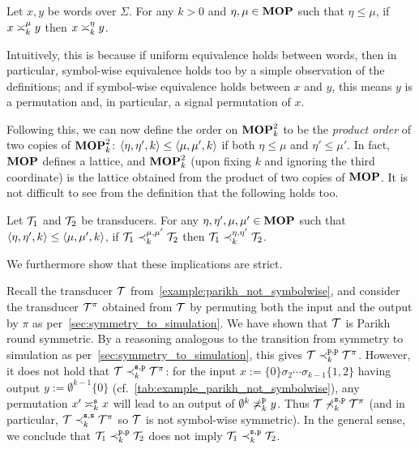 \begin{lemma}
\label{lemma:partial_order_rstypes}
    Let $x,y$ be words over $\Sigma$. For any $k>0$ and $\eta,\mu\in\RSTYPES$ such that $\eta\leq \mu$, if $x\req[k]^\mu y$ then $x\req[k]^\eta y$.
\end{lemma}

Intuitively, this is because if uniform equivalence holds between words, then in particular, symbol-wise equivalence holds too by a simple observation of the definitions; and if symbol-wise equivalence holds between $x$ and $y$, this means $y$ is a permutation and, in particular, a signal permutation of $x$.

Following this, we can now define the order on $\RSTUPS$ to be the \emph{product order} of two copies of $\RSTUPS$: $\tup{\eta, \eta', k}\leq \tup{\mu, \mu', k}$ if both $\eta\leq \mu$ and $\eta'\leq \mu'$. In fact, $\RSTYPES$ defines a lattice, and $\RSTUPS$ (upon fixing $k$ and ignoring the third coordinate) is the lattice obtained from the product of two copies of $\RSTYPES$. It is not difficult to see from the definition that the following holds too.

\begin{lemma}
\label{lemma:partial_order_tups}
        Let $\cT_1$ and $\cT_2$ be transducers. For any $\eta,\eta',\mu,\mu'\in\RSTYPES$ such that $\tup{\eta,\eta',k}\leq \tup{\mu,\mu',k}$, if $\cT_1 \prec_{k}^{\mu,\mu'} \cT_2$ then $\cT_1 \prec_{k}^{\eta,\eta'} \cT_2$.
\end{lemma}
We furthermore show that these implications are strict.

\begin{example}
\label{example:gap1}
Recall the transducer $\cT$ from~\cref{example:parikh_not_symbolwise}, and consider the transducer $\cT^\pi$ obtained from $\cT$ by permuting both the input and the output by $\pi$ as per~\cref{sec:symmetry_to_simulation}. We have shown that $\cT$ is Parikh round symmetric. By a reasoning analogous to the transition from symmetry to simulation as per~\cref{sec:symmetry_to_simulation}, this gives $\cT\prectype{p}{p}_k \cT^\pi$. However, it does not hold that $\cT\prectype{s}{p}_k \cT^\pi$: for the input $x:=\{0\}\sigma_2\cdots \sigma_{k-1}\{1,2\}$ having output $y:=\emptyset^{k-1}\{0\}$ (cf.~\cref{tab:example_parikh_not_symbolwise}), any permutation $x'\reqtype[k]{s} x$ will lead to an output of $\emptyset^k\not\reqtype[k]{p} y$. Thus $\cT\not\prectype{s}{p}_k \cT^\pi$ (and in particular, $\cT\prectype{s}{s}_k \cT^\pi$ so $\cT$ is not symbol-wise symmetric). In the general sense, we conclude that $\cT_1\prectype{p}{p}_k \cT_2$ does not imply $\cT_1\prectype{s}{p}_k \cT_2$.
\end{example}

